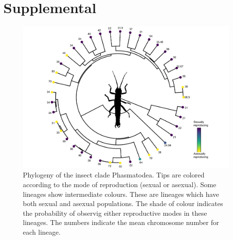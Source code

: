 \section{Supplemental}
\vfill

\setcounter{figure}{0}
\renewcommand{\thefigure}{S\arabic{figure}}
\setcounter{table}{0}
\renewcommand{\thetable}{S\arabic{table}}

\newpage
\begin{figure}
\centering \includegraphics[width=1\textwidth]{figures/phasmatodea_phylogeny.pdf}
\caption{Phylogeny of the insect clade Phasmatodea. Tips are colored according to the mode of reproduction (sexual or asexual). Some lineages show intermediate colours. These are lineages which have both sexual and asexual populations. The shade of colour indicates the probability of observig either reproductive modes in these lineages. The numbers indicate the mean chromosome number for each lineage.}
\label{fig:phas.phylo}
\end{figure}
